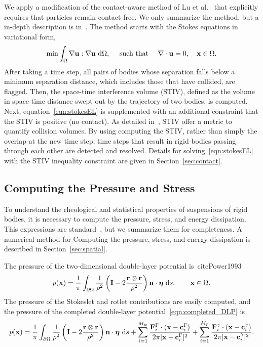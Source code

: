 \documentclass[preprint, 10pt]{elsarticle}
\begin{document}
We apply a modification of the contact-aware method of Lu et
al.~\cite{Lu2017} that explicitly requires that particles remain
contact-free. We only summarize the method, but a in-depth description
is in~\cite{Lu2017}.  The method starts with the Stokes equations in
variational form,
\begin{align}
  \min \int_{\Omega} \nabla{\mathbf{u}}:\nabla{\mathbf{u}}~\text{d}\Omega,
  \quad\text{ such that }\quad \nabla\cdot{\mathbf{u}} = 0, 
  \quad {\mathbf{x}} \in \Omega.
  \label{eqn:stokesEL}
\end{align} 
After taking a time step, all pairs of bodies whose separation falls
below a minimum separation distance, which includes those that have
collided, are flagged.  Then, the space-time interference volume (STIV),
defined as the volume in space-time distance swept out by the trajectory
of two bodies, is computed.  Next, equation~\eqref{eqn:stokesEL} is
supplemented with an additional constraint that the STIV is positive (no
contact).  As detailed in~\cite{Lu2017, Harmon2011}, STIV offer a metric
to quantify collision volumes.  By using computing the STIV, rather than
simply the overlap at the new time step, time steps that result in rigid
bodies passing through each other are detected and resolved.  Details
for solving~\eqref{eqn:stokesEL} with the STIV inequality constraint are
given in Section~\ref{sec:contact}.




\subsection{Computing the Pressure and Stress}
To understand the rheological and statistical properties of suspensions
of rigid bodies, it is necessary to compute the pressure, stress, and
energy dissipation.  This expressions are standard~\cite{Power1993}, but
we summarize them for completeness.  A numerical method for Computing
the pressure, stress, and energy dissipation is described in
Section~\ref{sec:spatial}.

The pressure of the two-dimensional double-layer potential
is~cite{Power1993}
\begin{align*}
  p({\mathbf{x}}) = \frac{1}{\pi}\int_{\partial\Omega}\frac{1}{\rho^2}\left(
\mathbf{I} - 2\frac{{\mathbf{r}} \otimes {\mathbf{r}}}{\rho^2}\right){\mathbf{n}}\cdot{\boldsymbol\eta}~\text{d}s,
\qquad{\mathbf{x}}\in\Omega.
\end{align*}
The pressure of the Stokeslet and rotlet contributions are easily
computed, and the pressure of the completed double-layer
potential~\eqref{eqn:completed_DLP} is
\begin{align}
  \label{eqn:pressure} 
  p({\mathbf{x}}) = \frac{1}{\pi}\int_{\partial\Omega}\frac{1}{\rho^2}\left(
    \mathbf{I} - 2\frac{{\mathbf{r}} \otimes {\mathbf{r}}}{\rho^2}\right){\mathbf{n}}\cdot{\boldsymbol\eta}~\text{d}s +
  \sum_{i=1}^{M_w}
  \frac{{\mathbf{F}}_i^\Gamma\cdot({\mathbf{x}}-{\mathbf{c}}_i^\Gamma)}{2\pi|{\mathbf{x}}-{\mathbf{c}}_i^{\Gamma}|^2}
  + \sum_{i=1}^{M_p}
    \frac{{\mathbf{F}}_i^\gamma\cdot({\mathbf{x}}-{\mathbf{c}}_i^\gamma)}{2\pi|{\mathbf{x}}-{\mathbf{c}}_i^\gamma|^2}.
\end{align}
\end{document}
